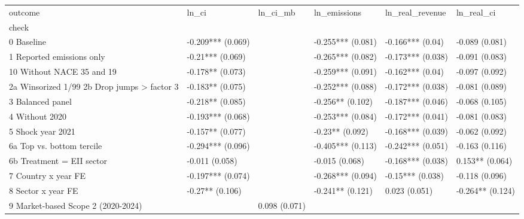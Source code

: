 \begin{tabular}{llllll}
\toprule
outcome & ln_ci & ln_ci_mb & ln_emissions & ln_real_revenue & ln_real_ci \\
check &  &  &  &  &  \\
\midrule
0 Baseline & -0.209*** (0.069) &  & -0.255*** (0.081) & -0.166*** (0.04) & -0.089 (0.081) \\
1 Reported emissions only & -0.21*** (0.069) &  & -0.265*** (0.082) & -0.173*** (0.038) & -0.091 (0.083) \\
10 Without NACE 35 and 19 & -0.178** (0.073) &  & -0.259*** (0.091) & -0.162*** (0.04) & -0.097 (0.092) \\
2a Winsorized 1/99%
2b Drop jumps > factor 3 & -0.183** (0.075) &  & -0.252*** (0.088) & -0.172*** (0.038) & -0.081 (0.089) \\
3 Balanced panel & -0.218** (0.085) &  & -0.256** (0.102) & -0.187*** (0.046) & -0.068 (0.105) \\
4 Without 2020 & -0.193*** (0.068) &  & -0.253*** (0.084) & -0.172*** (0.041) & -0.081 (0.083) \\
5 Shock year 2021 & -0.157** (0.077) &  & -0.23** (0.092) & -0.168*** (0.039) & -0.062 (0.092) \\
6a Top vs. bottom tercile & -0.294*** (0.096) &  & -0.405*** (0.113) & -0.242*** (0.051) & -0.163 (0.116) \\
6b Treatment = EII sector & -0.011 (0.058) &  & -0.015 (0.068) & -0.168*** (0.038) & 0.153** (0.064) \\
7 Country x year FE & -0.197*** (0.074) &  & -0.268*** (0.094) & -0.15*** (0.038) & -0.118 (0.096) \\
8 Sector x year FE & -0.27** (0.106) &  & -0.241** (0.121) & 0.023 (0.051) & -0.264** (0.124) \\
9 Market-based Scope 2 (2020-2024) &  & 0.098 (0.071) &  &  &  \\
\bottomrule
\end{tabular}
